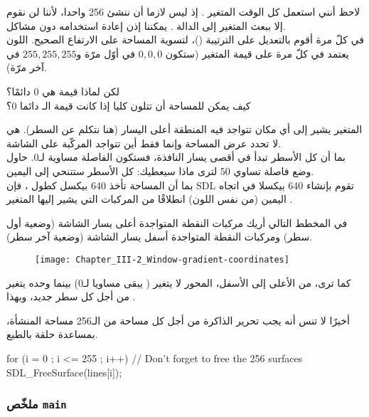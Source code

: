  لاحظ أنني استعمل كل الوقت المتغير 
.
إذ ليس لازما أن ننشئ 256 واحدا، لأننا لن نقوم إلا ببعث المتغير إلى الدالة 
.
يمكننا إذن إعادة استخدامه دون مشاكل.\\
في كلّ مرة أقوم بالتعديل على الترتيبة
()،
لتسوية المساحة على الارتفاع الصحيح. اللون يعتمد في كلّ مرة على قيمة المتغير
(ستكون
$0, 0, 0$
في أوّل مرّة و$255, 255, 255$ في آخر مرّة).

\begin{question}
لكن لماذا قيمة 
هي 0 دائمًا؟\\
كيف يمكن للمساحة أن تتلون كليا إذا كانت قيمة الـ
دائما 0؟
\end{question}

المتغير
يشير إلى أي مكان تتواجد فيه المنطقة أعلى اليسار (هنا نتكلم عن السطر). هي لا تحدد عرض المساحة وإنما فقط أين تتواجد المركّبة على الشاشة.\\
بما أن كل الأسطر تبدأ في أقصى يسار النافذة، فستكون الفاصلة مساوية لـ0. حاول وضع فاصلة تساوي 50 لترى ماذا سيعطيك: كل الأسطر ستتنحي إلى اليمين.\\
بما أن المساحة تأخذ 640 بيكسل كطول ، فإن \textenglish{SDL}
تقوم بإنشاء 640 بيكسلا في اتجاه اليمين (من نفس اللون) انطلاقًا من المركبات التي يشير إليها المتغير 
.

في المخطط التالي أريك مركبات النقطة المتواجدة أعلى يسار الشاشة (وضعية أول سطر) ومركبات النقطة المتواجدة أسفل يسار الشاشة (وضعية آخر سطر).

\begin{figure}[H]
	\centering
	\texttt{[image: Chapter\_III-2\_Window-gradient-coordinates]}
\end{figure}

كما ترى، من الأعلى إلى الأسفل، المحور لا يتغير 
(
يبقى مساويا لـ0) بينما 
وحده يتغير من أجل كل سطر جديد، وبهذا 
.

أخيرًا لا تنس أنه يجب تحرير الذاكرة من أجل كل مساحة من الـ256 مساحة المنشأة، بمساعدة حلقة بالطبع.

\begin{Csource}
for (i = 0 ; i <= 255 ; i++) // Don't forget to free the 256 surfaces
	SDL_FreeSurface(lines[i]);
\end{Csource}

\subsubsection{ملخّص \texttt{main}}

